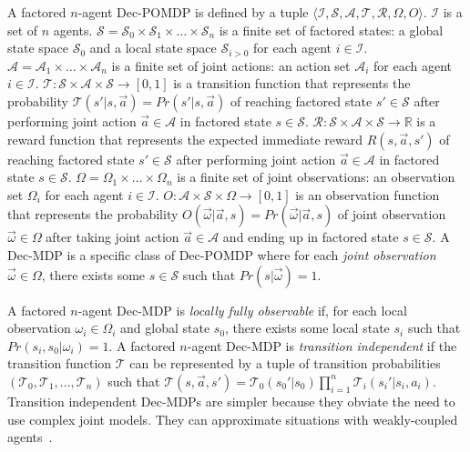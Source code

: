 \documentclass[letterpaper,10pt,conference]{ieeeconf}
\begin{document}
A factored $n$-agent Dec-POMDP is defined by a tuple $\langle \mathcal{I}, \mathcal{S}, \mathcal{A}, \mathcal{T}, \mathcal{R}, \Omega, O \rangle$. $\mathcal{I}$ is a set of $n$ agents. $\mathcal{S} = \mathcal{S}_0 \times \mathcal{S}_1 \times \dots \times \mathcal{S}_n$ is a finite set of factored states: a global state space $\mathcal{S}_0$ and a local state space $\mathcal{S}_{i > 0}$ for each agent $i  \in \mathcal{I}$. $\mathcal{A} = \mathcal{A}_1 \times \dots \times \mathcal{A}_n$ is a finite set of joint actions: an action set $\mathcal{A}_i$ for each agent $i \in \mathcal{I}$. $\mathcal{T}: \mathcal{S} \times \mathcal{A} \times \mathcal{S} \rightarrow [0,1]$ is a transition function that represents the probability $\mathcal{T}(s'|s, \vec{a}) = Pr(s'|s, \vec{a})$ of reaching factored state $s' \in \mathcal{S}$ after performing joint action $\vec{a} \in \mathcal{A}$ in factored state $s \in \mathcal{S}$. $\mathcal{R}: \mathcal{S} \times \mathcal{A} \times \mathcal{S} \rightarrow \mathbb{R}$ is a reward function that represents the expected immediate reward $R(s, \vec{a}, s')$ of reaching factored state $s' \in \mathcal{S}$ after performing joint action $\vec{a} \in \mathcal{A}$ in factored state $s \in \mathcal{S}$. $\Omega = \Omega_1 \times \dots \times \Omega_n$ is a finite set of joint observations: an observation set $\Omega_i$ for each agent $i \in \mathcal{I}$. $O: \mathcal{A} \times \mathcal{S} \times \Omega \rightarrow [0,1]$ is an observation function that represents the probability $O(\vec{\omega}|\vec{a}, s) = Pr(\vec{\omega}|\vec{a}, s)$ of joint observation $\vec{\omega} \in \Omega$ after taking joint action $\vec{a} \in \mathcal{A}$ and ending up in factored state $s \in \mathcal{S}$. A Dec-MDP is a specific class of Dec-POMDP where for each \textit{joint observation} $\vec{\omega} \in \Omega$, there exists some $s \in \mathcal{S}$ such that $Pr(s|\vec{\omega}) = 1$.

A factored $n$-agent Dec-MDP is \emph{locally fully observable} if, for each local observation $\omega_i \in \Omega_i$ and global state $s_0$, there exists some local state $s_i$ such that $Pr(s_i,s_0|\omega_i) = 1$. A factored $n$-agent Dec-MDP is \emph{transition independent} if the transition function $\mathcal{T}$ can be represented by a tuple of transition probabilities $(\mathcal{T}_0, \mathcal{T}_1, \dots, \mathcal{T}_n)$ such that $\mathcal{T}(s, \vec{a}, s') = \mathcal{T}_0(s_0'|s_0) \prod_{i=1}^n \mathcal{T}_i(s_i'|s_i, a_i)$. Transition independent Dec-MDPs are simpler because they obviate the need to use complex joint models. They can approximate situations with weakly-coupled agents~\cite{SZ:BZLGjair04}.
\end{document}
